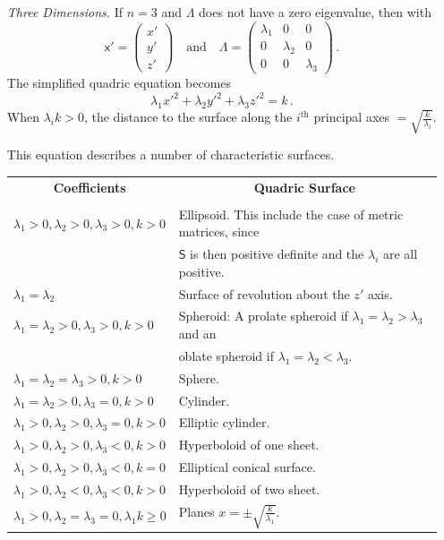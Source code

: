 \documentclass{article}
\theoremstyle{plain}\theoremheaderfont{\normalfont\itshape}\theorembodyfont{\rmfamily}\theoremseparator{.}\newtheorem*{rem}{Remark}\newtheorem*{ex}{Example}\newtheorem*{proof}{Proof}\newtheorem*{altp}{Alternative proof}
\theoremstyle{plain}\theoremheaderfont{\normalfont\bfseries}\theorembodyfont{\rmfamily}\theoremseparator{.}\newtheorem{thm}{Theorem}[section]\newtheorem{lem}[thm]{Lemma}\newtheorem{prop}[thm]{Proposition}\newtheorem*{cor}{Corollary}\newtheorem{defn}[thm]{Definition}\newtheorem{clm}[thm]{Claim}\newtheorem{clminproof}{Claim}
\theoremstyle{break}\theoremheaderfont{\normalfont\itshape}\theorembodyfont{\rmfamily}\theoremseparator{.\medskip}\newtheorem*{proofskip}{Proof}\newtheorem*{exs}{Examples}\newtheorem*{rems}{Remarks}
\theoremstyle{break}\theoremheaderfont{\normalfont\bfseries}\theorembodyfont{\rmfamily}\theoremseparator{.\medskip}\newtheorem{lemskip}[thm]{Lemma}\newtheorem{defnskip}[thm]{Definition}\newtheorem{propskip}[thm]{Proposition}\newtheorem{thmskip}[thm]{Theorem}
\numberwithin{equation}{section}
\begin{document}
	\begin{itemize}[leftmargin=30pt,itemindent=55pt]
		\item[\textit{Three Dimensions.}] If \(n=3\) and \(\mathsf{\Lambda}\) does not have a zero eigenvalue, then with
		\[\mathsf{x}'=\begin{pmatrix}
			x' \\ y' \\ z'
		\end{pmatrix}\quad\text{and}\quad\mathsf{\Lambda}=\begin{pmatrix}
			\lambda_1 & 0 & 0\\
			0 & \lambda_2 & 0\\
			0 & 0 & \lambda_3
		\end{pmatrix}\,.\]
		The simplified quadric equation becomes
		\[\lambda_1 x'^2+\lambda_2 y'^2+\lambda_3 z'^2=k\,.\]
		When \(\lambda_i k>0\), the distance to the surface along the \(i^\text{th}\) principal axes \(=\sqrt{\frac{k}{\lambda_i}}\).
		
		This equation describes a number of characteristic surfaces.
		
		\begin{table}[ht!]
			\centering
			\begin{tabular}{ll}
				\multicolumn{1}{c}{\textbf{Coefficients}} & \multicolumn{1}{c}{\textbf{Quadric Surface}}\\
				 & \\
				\(\lambda_1>0,\lambda_2>0,\lambda_3>0,k>0\) & Ellipsoid. This include the case of metric matrices, since\\
				 & \(\mathsf{S}\) is then positive definite and the \(\lambda_i\) are all positive.\\[5pt]
				\(\lambda_1=\lambda_2\) & Surface of revolution about the \(z'\) axis.\\[5pt]
				\(\lambda_1=\lambda_2>0,\lambda_3>0,k>0\) & Spheroid: A prolate spheroid if \(\lambda_1=\lambda_2>\lambda_3\) and an\\
				 & oblate spheroid if \(\lambda_1=\lambda_2<\lambda_3\).\\[5pt]
				\(\lambda_1=\lambda_2=\lambda_3>0,k>0\) & Sphere.\\[5pt]
				\(\lambda_1=\lambda_2>0,\lambda_3=0,k>0\) & Cylinder. \\[5pt]
				\(\lambda_1>0,\lambda_2>0,\lambda_3=0,k>0\) & Elliptic cylinder. \\[5pt]
				\(\lambda_1>0,\lambda_2>0,\lambda_3<0,k>0\) & Hyperboloid of one sheet. \\[5pt]
				\(\lambda_1>0,\lambda_2>0,\lambda_3<0,k=0\) & Elliptical conical surface. \\[5pt]
				\(\lambda_1>0,\lambda_2<0,\lambda_3<0,k>0\) & Hyperboloid of two sheet. \\[5pt]
				\(\lambda_1>0,\lambda_2=\lambda_3=0,\lambda_1k\ge0\) & Planes \(x=\pm\sqrt{\frac{k}{\lambda_1}}\). \\[5pt]
			\end{tabular}
		\end{table}
	\end{itemize}
	
\end{document}
